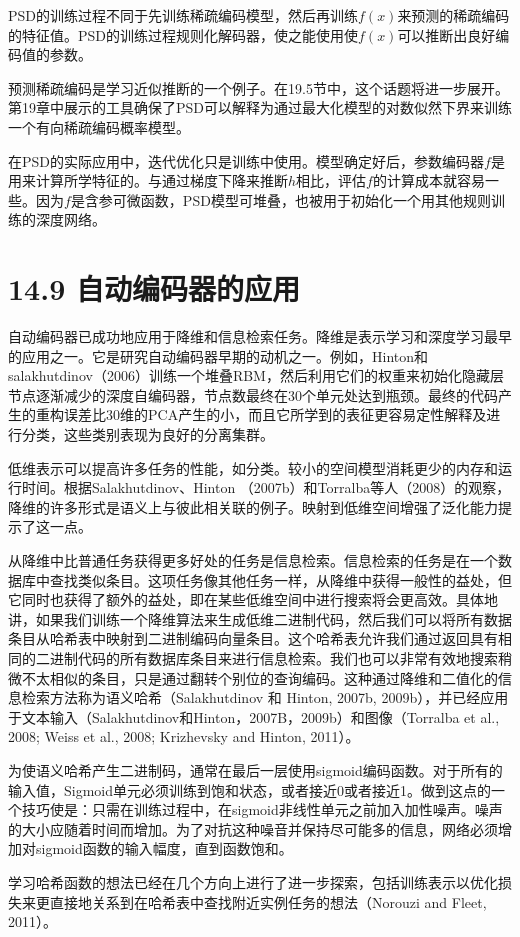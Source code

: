 \documentclass[a4paper,11pt]{book}
\begin{document}
PSD的训练过程不同于先训练稀疏编码模型，然后再训练$f(x)$来预测的稀疏编码的特征值。PSD的训练过程规则化解码器，使之能使用使$f(x)$可以推断出良好编码值的参数。

预测稀疏编码是学习近似推断的一个例子。在19.5节中，这个话题将进一步展开。第19章中展示的工具确保了PSD可以解释为通过最大化模型的对数似然下界来训练一个有向稀疏编码概率模型。

在PSD的实际应用中，迭代优化只是训练中使用。模型确定好后，参数编码器$f$是用来计算所学特征的。与通过梯度下降来推断$h$相比，评估$f$的计算成本就容易一些。因为$f$是含参可微函数，PSD模型可堆叠，也被用于初始化一个用其他规则训练的深度网络。

\section{14.9 自动编码器的应用}
自动编码器已成功地应用于降维和信息检索任务。降维是表示学习和深度学习最早的应用之一。它是研究自动编码器早期的动机之一。例如，Hinton和salakhutdinov（2006）训练一个堆叠RBM，然后利用它们的权重来初始化隐藏层节点逐渐减少的深度自编码器，节点数最终在30个单元处达到瓶颈。最终的代码产生的重构误差比30维的PCA产生的小，而且它所学到的表征更容易定性解释及进行分类，这些类别表现为良好的分离集群。

低维表示可以提高许多任务的性能，如分类。较小的空间模型消耗更少的内存和运行时间。根据Salakhutdinov、Hinton （2007b）和Torralba等人（2008）的观察，降维的许多形式是语义上与彼此相关联的例子。映射到低维空间增强了泛化能力提示了这一点。

从降维中比普通任务获得更多好处的任务是信息检索。信息检索的任务是在一个数据库中查找类似条目。这项任务像其他任务一样，从降维中获得一般性的益处，但它同时也获得了额外的益处，即在某些低维空间中进行搜索将会更高效。具体地讲，如果我们训练一个降维算法来生成低维二进制代码，然后我们可以将所有数据条目从哈希表中映射到二进制编码向量条目。这个哈希表允许我们通过返回具有相同的二进制代码的所有数据库条目来进行信息检索。我们也可以非常有效地搜索稍微不太相似的条目，只是通过翻转个别位的查询编码。这种通过降维和二值化的信息检索方法称为语义哈希（Salakhutdinov 和 Hinton, 2007b, 2009b），并已经应用于文本输入（Salakhutdinov和Hinton，2007B，2009b）和图像（Torralba et al., 2008; Weiss et al., 2008; Krizhevsky and Hinton, 2011）。

为使语义哈希产生二进制码，通常在最后一层使用sigmoid编码函数。对于所有的输入值，Sigmoid单元必须训练到饱和状态，或者接近0或者接近1。做到这点的一个技巧使是：只需在训练过程中，在sigmoid非线性单元之前加入加性噪声。噪声的大小应随着时间而增加。为了对抗这种噪音并保持尽可能多的信息，网络必须增加对sigmoid函数的输入幅度，直到函数饱和。

学习哈希函数的想法已经在几个方向上进行了进一步探索，包括训练表示以优化损失来更直接地关系到在哈希表中查找附近实例任务的想法（Norouzi and Fleet, 2011）。
\end{document}

